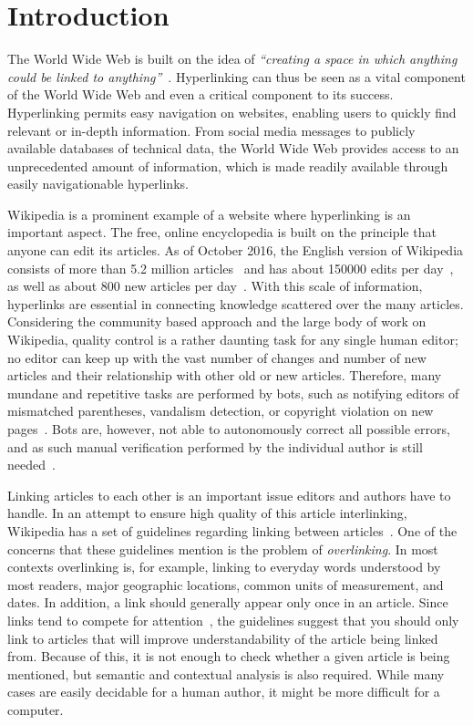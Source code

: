 \chapter{Introduction}\label{ch:introduction}
The World Wide Web is built on the idea of \emph{``creating a space in which anything could be linked to anything''}~\cite[p.~4]{Weaving-the-web}. Hyperlinking can thus be seen as a vital component of the World Wide Web and even a critical component to its success. Hyperlinking permits easy navigation on websites, enabling users to quickly find relevant or in-depth information. From social media messages to publicly available databases of technical data, the World Wide Web provides access to an unprecedented amount of information, which is made readily available through easily navigationable hyperlinks.

Wikipedia is a prominent example of a website where hyperlinking is an important aspect. The free, online encyclopedia is built on the principle that anyone can edit its articles. As of October 2016, the English version of Wikipedia consists of more than 5.2 million articles~\cite{wiki-about} and has about \num{150000} edits per day~\cite{wiki-num-edits}, as well as about 800 new articles per day~\cite{wmcharts}. With this scale of information, hyperlinks are essential in connecting knowledge scattered over the many articles. Considering the community based approach and the large body of work on Wikipedia, quality control is a rather daunting task for any single human editor; no editor can keep up with the vast number of changes and number of new articles and their relationship with other old or new articles. Therefore, many mundane and repetitive tasks are performed by bots, such as notifying editors of mismatched parentheses, vandalism detection, or copyright violation on new pages~\cite{wiki-bots}. Bots are, however, not able to autonomously correct all possible errors, and as such manual verification performed by the individual author is still needed~\cite{wiki-bot-policy}.

Linking articles to each other is an important issue editors and authors have to handle. In an attempt to ensure high quality of this article interlinking, Wikipedia has a set of guidelines regarding linking between articles~\cite{wiki-manual-of-style-overlinking}. One of the concerns that these guidelines mention is the problem of \emph{overlinking}. In most contexts overlinking is, for example, linking to everyday words understood by most readers, major geographic locations, common units of measurement, and dates. In addition, a link should generally appear only once in an article. Since links tend to compete for attention~\cite{hyperlink-structure-using-logs}, the guidelines suggest that you should only link to articles that will improve understandability of the article being linked from. Because of this, it is not enough to check whether a given article is being mentioned, but semantic and contextual analysis is also required. While many cases are easily decidable for a human author, it might be more difficult for a computer.

